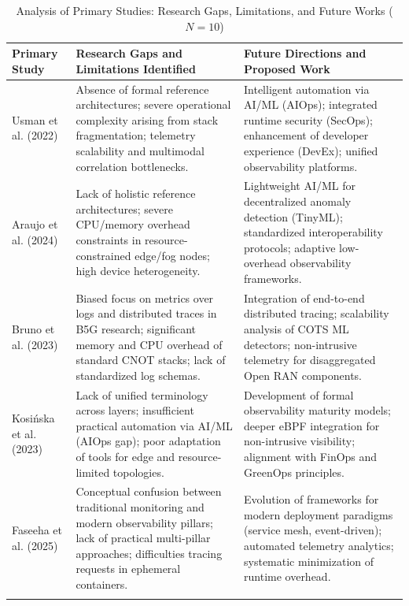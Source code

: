 \begin{table}[!ht]
\centering
\caption{Analysis of Primary Studies: Research Gaps, Limitations, and Future Works ($N = 10$)}
\label{tab:related_works}
\footnotesize
\begin{tabular}{p{} p{} p{}}
\toprule
\textbf{Primary Study} & \textbf{Research Gaps and Limitations Identified} & \textbf{Future Directions and Proposed Work} \\ \midrule

Usman et al. (2022)~\cite{usman_2022} &
Absence of formal reference architectures; severe operational complexity arising from stack fragmentation; telemetry scalability and multimodal correlation bottlenecks. & 
Intelligent automation via AI/ML (AIOps); integrated runtime security (SecOps); enhancement of developer experience (DevEx); unified observability platforms. \\ \addlinespace

Araujo et al. (2024)~\cite{araujo_24} &
Lack of holistic reference architectures; severe CPU/memory overhead constraints in resource-constrained edge/fog nodes; high device heterogeneity. & 
Lightweight AI/ML for decentralized anomaly detection (TinyML); standardized interoperability protocols; adaptive low-overhead observability frameworks. \\ \addlinespace

Bruno et al. (2023)~\cite{zanatta_23} &
Biased focus on metrics over logs and distributed traces in B5G research; significant memory and CPU overhead of standard CNOT stacks; lack of standardized log schemas. & 
Integration of end-to-end distributed tracing; scalability analysis of COTS ML detectors; non-intrusive telemetry for disaggregated Open RAN components. \\ \addlinespace

Kosińska et al. (2023)~\cite{kosinska_2023} &
Lack of unified terminology across layers; insufficient practical automation via AI/ML (AIOps gap); poor adaptation of tools for edge and resource-limited topologies. & 
Development of formal observability maturity models; deeper eBPF integration for non-intrusive visibility; alignment with FinOps and GreenOps principles. \\ \addlinespace

Faseeha et al. (2025)~\cite{faseeha_2025} &
Conceptual confusion between traditional monitoring and modern observability pillars; lack of practical multi-pillar approaches; difficulties tracing requests in ephemeral containers. & 
Evolution of frameworks for modern deployment paradigms (service mesh, event-driven); automated telemetry analytics; systematic minimization of runtime overhead. \\ \addlinespace


\end{tabular}
\end{table}
